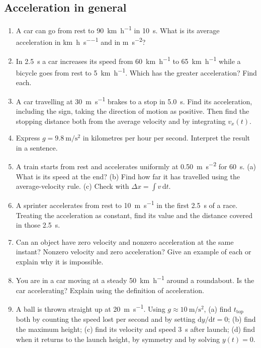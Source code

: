 \documentclass[11pt,twoside,openany]{book}
\newcommand{\dd}{\mathrm{d}}
\begin{document}
\subsection*{Acceleration in general}
\begin{enumerate}[label=\textbf{\thechapter.\arabic*},resume=exercises,leftmargin=*]
  \item A car can go from rest to \SI{90}{\kilo\metre\per\hour} in \SI{10}{\second}. What is its average acceleration in \si{\kilo\metre\per\hour\per\second} and in \si{\metre\per\second\squared}?
  \item In \SI{2.5}{\second} a car increases its speed from \SI{60}{\kilo\metre\per\hour} to \SI{65}{\kilo\metre\per\hour} while a bicycle goes from rest to \SI{5}{\kilo\metre\per\hour}. Which has the greater acceleration? Find each.
  \item A car travelling at \SI{30}{\metre\per\second} brakes to a stop in \SI{5.0}{\second}. Find its acceleration, including the sign, taking the direction of motion as positive. Then find the stopping distance both from the average velocity and by integrating $v_x(t)$.
  \item Express $g = \SI{9.8}{\metre\per\second\squared}$ in kilometres per hour per second. Interpret the result in a sentence.
  \item A train starts from rest and accelerates uniformly at \SI{0.50}{\metre\per\second\squared} for \SI{60}{\second}. (a) What is its speed at the end? (b) Find how far it has travelled using the average-velocity rule. (c) Check with $\Delta x = \int v\,\dd t$.
  \item A sprinter accelerates from rest to \SI{10}{\metre\per\second} in the first \SI{2.5}{\second} of a race. Treating the acceleration as constant, find its value and the distance covered in those \SI{2.5}{\second}.
  \item Can an object have zero velocity and nonzero acceleration at the same instant? Nonzero velocity and zero acceleration? Give an example of each or explain why it is impossible.
  \item You are in a car moving at a steady \SI{50}{\kilo\metre\per\hour} around a roundabout. Is the car accelerating? Explain using the definition of acceleration.
  \item A ball is thrown straight up at \SI{20}{\metre\per\second}. Using $g \approx \SI{10}{\metre\per\second\squared}$, (a) find $t_{\text{top}}$ both by counting the speed lost per second and by setting $\dd y/\dd t = 0$; (b) find the maximum height; (c) find its velocity and speed \SI{3}{\second} after launch; (d) find when it returns to the launch height, by symmetry and by solving $y(t) = 0$.

\end{enumerate}
\end{document}
